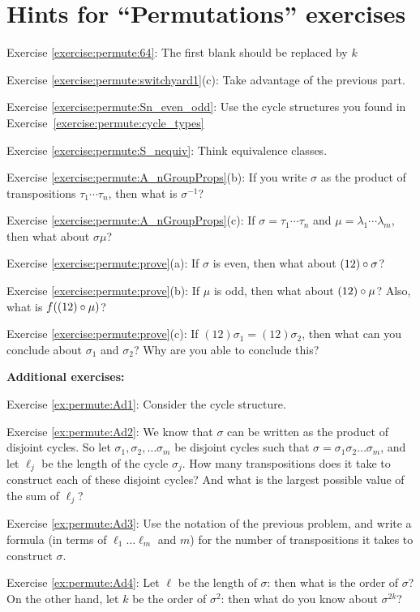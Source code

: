 \section{Hints for ``Permutations'' exercises}\label{sec:permute:hints} 

\noindent Exercise \ref{exercise:permute:64}: The first blank should be replaced by $k$

\noindent Exercise \ref{exercise:permute:switchyard1}(c): Take advantage of the previous part.

\noindent Exercise \ref{exercise:permute:Sn_even_odd}: Use the cycle structures you found in Exercise~\ref{exercise:permute:cycle_types}

\noindent Exercise \ref{exercise:permute:S_nequiv}: Think equivalence classes.

\noindent Exercise \ref{exercise:permute:A_nGroupProps}(b): If you write $\sigma$ as the product of transpositions $\tau_1 \cdots \tau_{n}$, then what is $\sigma^{-1}$?

\noindent Exercise \ref{exercise:permute:A_nGroupProps}(c): If $\sigma = \tau_1 \cdots \tau_{n}$ and $\mu = \lambda_1 \cdots \lambda_{m}$, then what about $\sigma \mu$?

\noindent Exercise \ref{exercise:permute:prove}(a): If $\sigma$ is even, then what about $(1 2) \circ \sigma$?

\noindent Exercise \ref{exercise:permute:prove}(b): If $\mu$ is odd, then what about $(1 2) \circ \mu$? Also, what is $f( (1 2) \circ \mu )$?

\noindent Exercise \ref{exercise:permute:prove}(c): If $(1 2) \sigma_1 = (1 2) \sigma_2$, then what can you conclude about $\sigma_1$ and $\sigma_2$? Why are you able to conclude this?
\bigskip

\textbf{Additional exercises:}

\noindent Exercise \ref{ex:permute:Ad1}: Consider the cycle structure.

\noindent Exercise \ref{ex:permute:Ad2}: We know that $\sigma$ can be written as the product of disjoint cycles. So let $\sigma_1, \sigma_2, \ldots \sigma_m$ be disjoint cycles such that  $\sigma = \sigma_1 \sigma_2 \ldots \sigma_m$, and let $\ell_j$ be the length of the cycle $\sigma_j$. How many transpositions does it take to construct each of these disjoint cycles? And what is the largest possible value of the sum of $\ell_j$?

\noindent Exercise \ref{ex:permute:Ad3}: Use the notation of the previous problem, and write a formula (in terms of $\ell_1 \ldots \ell_m$ and $m$) for the number of transpositions it takes to construct $\sigma$.

\noindent Exercise \ref{ex:permute:Ad4}: Let $\ell$ be the length of $\sigma$: then what is the order of $\sigma$? On the other hand, let $k$ be the order of $\sigma^2$: then what do you know about $\sigma^{2k}$?
